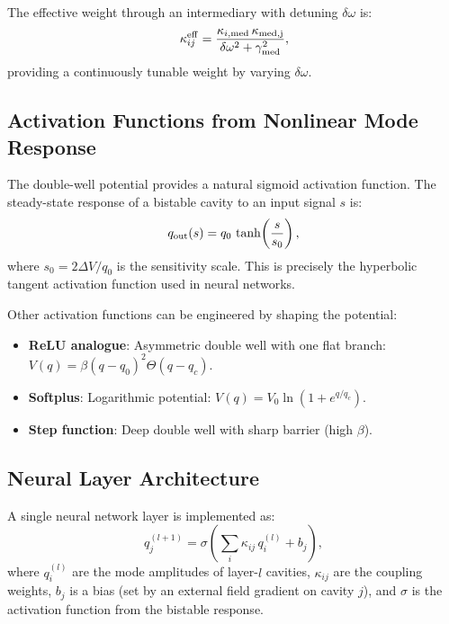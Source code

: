 \documentclass[12pt,a4paper,twoside]{article}
\begin{document}
The effective weight through an intermediary with detuning $\delta\omega$ is:
\begin{equation}
\kappa_{ij}^{\rm eff} = \frac{\kappa_{i,\rm med}\,\kappa_{\rm med,j}}{\delta\omega^2 + \gamma_{\rm med}^2},
\label{eq:mediated_weight}
\end{equation}
providing a continuously tunable weight by varying $\delta\omega$.

\subsection{Activation Functions from Nonlinear Mode Response}\label{sec:activation}

The double-well potential provides a natural sigmoid activation function. The steady-state response of a bistable cavity to an input signal $s$ is:
\begin{equation}
q_{\rm out}(s) = q_0\,\tanh\!\left(\frac{s}{s_0}\right),
\label{eq:activation}
\end{equation}
where $s_0 = 2\Delta V / q_0$ is the sensitivity scale. This is precisely the hyperbolic tangent activation function used in neural networks.

Other activation functions can be engineered by shaping the potential:
\begin{itemize}
\item \textbf{ReLU analogue}: Asymmetric double well with one flat branch: $V(q) = \beta(q - q_0)^2\Theta(q - q_c)$.
\item \textbf{Softplus}: Logarithmic potential: $V(q) = V_0 \ln(1 + e^{q/q_c})$.
\item \textbf{Step function}: Deep double well with sharp barrier (high $\beta$).
\end{itemize}

\subsection{Neural Layer Architecture}\label{sec:neural_layer}

A single neural network layer is implemented as:
\begin{equation}
q_j^{(l+1)} = \sigma\!\left(\sum_i \kappa_{ij}\,q_i^{(l)} + b_j\right),
\label{eq:neural_layer}
\end{equation}
where $q_i^{(l)}$ are the mode amplitudes of layer-$l$ cavities, $\kappa_{ij}$ are the coupling weights, $b_j$ is a bias (set by an external field gradient on cavity $j$), and $\sigma$ is the activation function from the bistable response.
\end{document}
